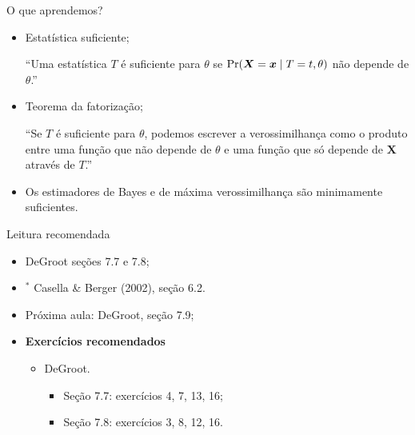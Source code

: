 \begin{frame}{O que aprendemos?}
\begin{itemize}
  \item[\faLightbulbO] Estatística suficiente;
    
    ``Uma estatística $T$ é suficiente para $\theta$ se $\operatorname{Pr}(\boldsymbol{X} = \boldsymbol{x} \mid T = t, \theta)$ não depende de $\theta$.''
    
   \item[\faLightbulbO] Teorema da fatorização;
   
   ``Se $T$ é suficiente para $\theta$, podemos escrever a verossimilhança como o produto entre uma função que não depende de $\theta$ e uma função que só depende de $\boldsymbol{X}$ através de $T$.'' 
   
     \item[\faLightbulbO] Os estimadores de Bayes e de máxima verossimilhança são minimamente suficientes.   
    
  \end{itemize}
 \end{frame}

\begin{frame}{Leitura recomendada}
\begin{itemize}
 \item[\faBook] DeGroot seções 7.7 e 7.8;
 \item[\faBook] $^\ast$ Casella \& Berger (2002), seção 6.2.
 \item[\faForward] Próxima aula: DeGroot, seção 7.9;
 \item {\large\textbf{Exercícios recomendados}}
 \begin{itemize}
  \item[\faBookmark] DeGroot.
  \begin{itemize}
   \item Seção 7.7: exercícios 4, 7, 13, 16;
   \item Seção 7.8: exercícios 3, 8, 12, 16.
  \end{itemize}   
  \end{itemize}
 \end{itemize} 
\end{frame}
